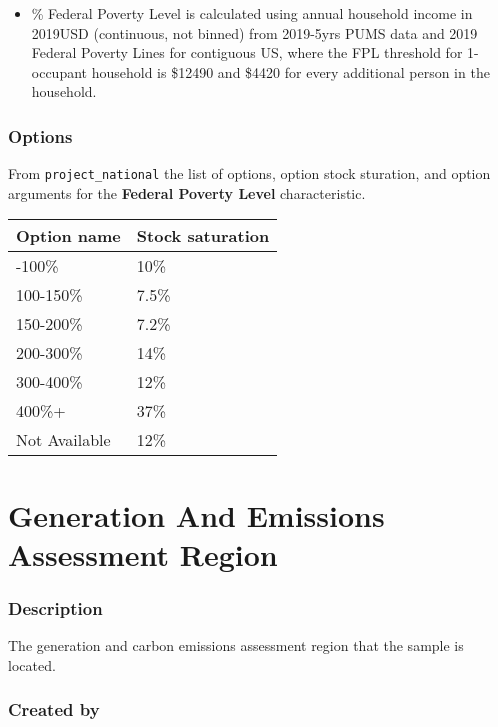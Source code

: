\begin{itemize}
 
\item
  \% Federal Poverty Level is calculated using annual household income
  in 2019USD (continuous, not binned) from 2019-5yrs PUMS data and 2019
  Federal Poverty Lines for contiguous US, where the FPL threshold for
  1-occupant household is \$12490 and \$4420 for every additional person
  in the household.
\end{itemize}

\subsubsection{Options}\label{options-41}

From \texttt{project\_national} the list of options, option stock
sturation, and option arguments for the \textbf{Federal Poverty Level}
characteristic.

\begin{longtable}[]{@{}ll@{}}
\toprule\noalign{}
Option name & Stock saturation \\
\midrule\noalign{}
\endhead
\bottomrule\noalign{}
\endlastfoot
0-100\% & 10\% \\
100-150\% & 7.5\% \\
150-200\% & 7.2\% \\
200-300\% & 14\% \\
300-400\% & 12\% \\
400\%+ & 37\% \\
Not Available & 12\% \\
\end{longtable}

\section{Generation And Emissions Assessment
Region}\label{generation_and_emissions_assessment_region}

\subsubsection{Description}\label{description-42}

The generation and carbon emissions assessment region that the sample is
located.

\subsubsection{Created by}\label{created-by-42}

